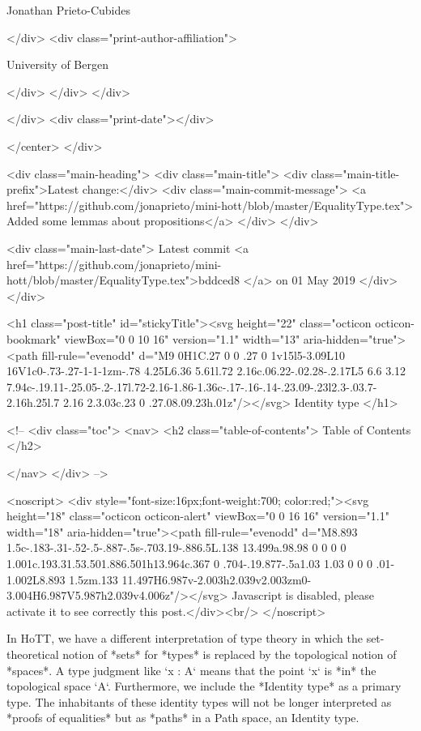                   Jonathan Prieto-Cubides
                
              </div>
              <div class="print-author-affiliation">
                
                  University of Bergen
                
                </div>
            </div>
          </div>
          
          
        </div>
        <div class="print-date"></div>
        
        
    </center>
  </div>

  
  <div class="main-heading">
    <div class="main-title">
      <div class="main-title-prefix">Latest change:</div>
      <div class="main-commit-message">
            <a href="https://github.com/jonaprieto/mini-hott/blob/master/EqualityType.tex">
              Added some lemmas about propositions</a>
      </div>
    </div>

    <div class="main-last-date">
      Latest commit <a href="https://github.com/jonaprieto/mini-hott/blob/master/EqualityType.tex">bddced8 </a> on  01 May 2019
    </div>
  </div>
  
  <h1 class="post-title" id="stickyTitle"><svg height="22" class="octicon octicon-bookmark" viewBox="0 0 10 16" version="1.1" width="13" aria-hidden="true"><path fill-rule="evenodd" d="M9 0H1C.27 0 0 .27 0 1v15l5-3.09L10 16V1c0-.73-.27-1-1-1zm-.78 4.25L6.36 5.61l.72 2.16c.06.22-.02.28-.2.17L5 6.6 3.12 7.94c-.19.11-.25.05-.2-.17l.72-2.16-1.86-1.36c-.17-.16-.14-.23.09-.23l2.3-.03.7-2.16h.25l.7 2.16 2.3.03c.23 0 .27.08.09.23h.01z"/></svg> Identity type
  </h1>

  <!-- 
  <div class="toc">
    <nav>
    <h2 class="table-of-contents"> Table of Contents </h2>
      

    </nav>
  </div>
   -->

  <noscript>
  <div style="font-size:16px;font-weight:700; color:red;"><svg height="18" class="octicon octicon-alert" viewBox="0 0 16 16" version="1.1" width="18" aria-hidden="true"><path fill-rule="evenodd" d="M8.893 1.5c-.183-.31-.52-.5-.887-.5s-.703.19-.886.5L.138 13.499a.98.98 0 0 0 0 1.001c.193.31.53.501.886.501h13.964c.367 0 .704-.19.877-.5a1.03 1.03 0 0 0 .01-1.002L8.893 1.5zm.133 11.497H6.987v-2.003h2.039v2.003zm0-3.004H6.987V5.987h2.039v4.006z"/></svg> Javascript is disabled, please activate it to see correctly this post.</div><br/>
  </noscript>

  In HoTT, we have a different interpretation of type theory in which the
set-theoretical notion of *sets* for *types* is replaced by the topological
notion of *spaces*. A type judgment like `x : A` means that the point `x`‌‌ is
*in* the topological space `A`‌‌. Furthermore, we include the *Identity type* as
a primary type. The inhabitants of these identity types will not be longer
interpreted as *proofs of equalities* but as *paths* in a Path space, an
Identity type.

